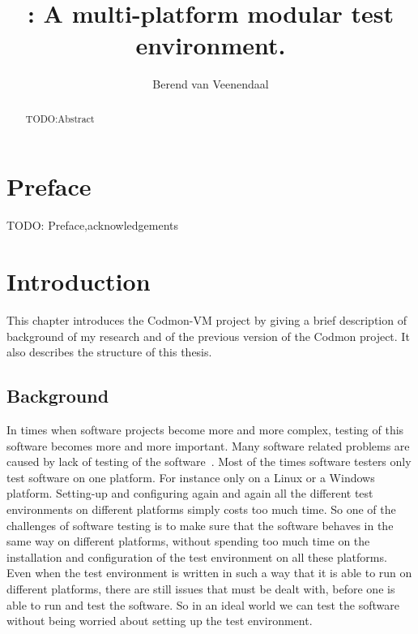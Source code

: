 \documentclass{article}
\title{\project{}: A multi-platform modular test environment.}
\author{Berend van Veenendaal}
\newcommand{\project}{Codmon-VM}
\begin{document}
\maketitle

\begin{abstract}
TODO:Abstract
\end{abstract}
\newpage
\section*{Preface}
\label{sec:Preface}
TODO: Preface,acknowledgements
\newpage
\tableofcontents
\newpage

\section{Introduction}
\label{sec:Introduction}
This chapter introduces the \project{} project by giving a brief description of background of my research and of the
previous version of the Codmon project. It also describes the structure of this thesis.

\subsection{Background}
\label{sec:Background}
In times when software projects become more and more complex, testing of this software becomes more and more important. Many software related problems are caused by lack of testing of the 
software~\cite{TTCST}. Most of the times software testers only test software on one platform. For instance only on a Linux or a Windows platform. Setting-up and configuring again and again all 
the different test environments on different platforms simply costs too much time. So one of the challenges of software testing is to make sure that the software behaves in the same way on 
different platforms, without spending too much time on the installation and configuration of the test environment on all these platforms. Even when the test environment is written in such a way 
that it is able to run on different platforms, there are still issues that must be dealt with, before one is able to run and test the software. So in an ideal world we can test the software without being 
worried about setting up the test environment. 
\end{document}

